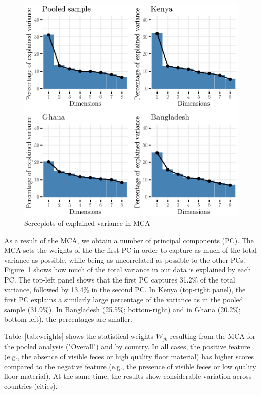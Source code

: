 \documentclass[natbib]{svjour3}                     %
\begin{document}
\begin{figure}[ht]
    \centering
    \includegraphics{figures/scree_pooled.eps}
    \caption{Screeplots of explained variance in MCA}
    \label{fig:scree}
\end{figure}

As a result of the MCA, we obtain a number of principal components (PC). The MCA sets the weights of the the first PC in order to capture as much of the total variance as possible, while being as uncorrelated as possible to the other PCs. Figure~\ref{fig:scree} shows how much of the total variance in our data is explained by each PC. The top-left panel shows that the first PC captures 31.2\% of the total variance, followed by 13.4\% in the second PC. In Kenya (top-right panel), the first PC explains a similarly large percentage of the variance as in the pooled sample (31.9\%). In Bangladesh (25.5\%; bottom-right) and in Ghana (20.2\%; bottom-left), the percentages are smaller. 

Table~\ref{tab:weights} shows the statistical weights $W_{jk}$ resulting from the MCA for the pooled analysis ("Overall") and by country. In all cases, the positive feature (e.g., the absence of visible feces or high quality floor material) has higher scores compared to the negative feature (e.g., the presence of visible feces or low quality floor material). At the same time, the results show considerable variation across countries (cities).

\end{document}
